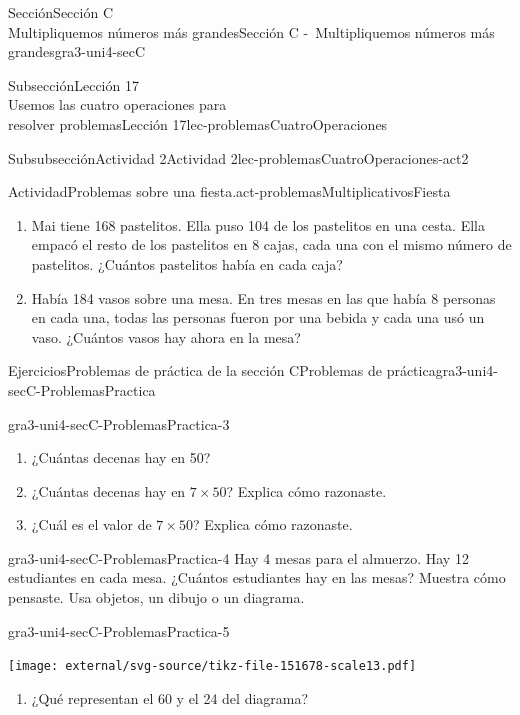 \begin{sectionptx}{Sección}{{\Large Sección C\\}Multipliquemos números más grandes}{}{Sección C -~Multipliquemos números más grandes}{}{}{gra3-uni4-secC}
\begin{subsectionptx}{Subsección}{{\normalsize Lección 17\\[-0.05cm]}Usemos las cuatro operaciones para\\resolver problemas}{}{Lección 17}{}{}{lec-problemasCuatroOperaciones}
\begin{subsubsectionptx}{Subsubsección}{Actividad 2}{}{Actividad 2}{}{}{lec-problemasCuatroOperaciones-act2}
\begin{activity}{Actividad}{Problemas sobre una fiesta.}{act-problemasMultiplicativosFiesta}
\begin{enumerate}
\item{}Mai tiene 168 pastelitos. Ella puso 104 de los pastelitos en una cesta. Ella empacó el resto de los pastelitos en 8 cajas, cada una con el mismo número de pastelitos. ¿Cuántos pastelitos había en cada caja?%
\item{}Había 184 vasos sobre una mesa. En tres mesas en las que había 8 personas en cada una, todas las personas fueron por una bebida y cada una usó un vaso. ¿Cuántos vasos hay ahora en la mesa?%
\end{enumerate}
\end{activity}%
\end{subsubsectionptx}
\end{subsectionptx}
%
%
\typeout{************************************************}
\typeout{************************************************}
%
\begin{exercises-subsection}{Ejercicios}{Problemas de práctica de la sección C}{}{Problemas de práctica}{}{}{gra3-uni4-secC-ProblemasPractica}
\begin{divisionexercise}{1}{}{}{gra3-uni4-secC-ProblemasPractica-3}%
%
\begin{enumerate}[label={(\alph*)}]
\item{}¿Cuántas decenas hay en 50?%
\item{}¿Cuántas decenas hay en \(7 \times 50\)? Explica cómo razonaste.%
\item{}¿Cuál es el valor de \(7 \times 50\)? Explica cómo razonaste.%
\end{enumerate}
\end{divisionexercise}%
\begin{divisionexercise}{2}{}{}{gra3-uni4-secC-ProblemasPractica-4}%
Hay 4 mesas para el almuerzo. Hay 12 estudiantes en cada mesa. ¿Cuántos estudiantes hay en las mesas? Muestra cómo pensaste. Usa objetos, un dibujo o un diagrama.%
\end{divisionexercise}%
\begin{divisionexercise}{3}{}{}{gra3-uni4-secC-ProblemasPractica-5}%
\begin{sidebyside}{2}{0.0125}{0.0125}{0.025}%
\begin{sbspanel}{0.35}%
\texttt{[image: external/svg-source/tikz-file-151678-scale13.pdf]}
\end{sbspanel}%
\begin{sbspanel}{0.6}%
%
\begin{enumerate}[label={(\alph*)}]
\item{}¿Qué representan el 60 y el 24 del diagrama?%

\end{enumerate}
\end{sbspanel}
\end{sidebyside}
\end{divisionexercise}
\end{exercises-subsection}
\end{sectionptx}
